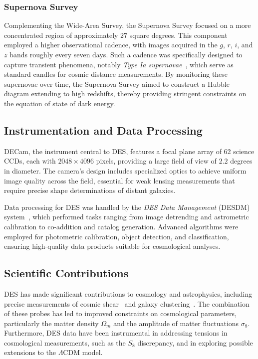 \subsubsection{Supernova Survey}

Complementing the Wide-Area Survey, the Supernova Survey focused on a more concentrated region of approximately $27$ square degrees. This component employed a higher observational cadence, with images acquired in the $g$, $r$, $i$, and $z$ bands roughly every seven days. Such a cadence was specifically designed to capture transient phenomena, notably \emph{Type Ia supernovae}~\cite{2019PhRvL.122q1301A}, which serve as standard candles for cosmic distance measurements. By monitoring these supernovae over time, the Supernova Survey aimed to construct a Hubble diagram extending to high redshifts, thereby providing stringent constraints on the equation of state of dark energy.

\subsection{Instrumentation and Data Processing}

DECam, the instrument central to DES, features a focal plane array of 62 science CCDs, each with $2048 \times 4096$ pixels, providing a large field of view of $2.2$ degrees in diameter. The camera's design includes specialized optics to achieve uniform image quality across the field, essential for weak lensing measurements that require precise shape determinations of distant galaxies.

Data processing for DES was handled by the \emph{DES Data Management} (DESDM) system~\cite{2008SPIE.7016E..0LM}, which performed tasks ranging from image detrending and astrometric calibration to co-addition and catalog generation. Advanced algorithms were employed for photometric calibration, object detection, and classification, ensuring high-quality data products suitable for cosmological analyses.

\subsection{Scientific Contributions}

DES has made significant contributions to cosmology and astrophysics, including precise measurements of cosmic shear~\cite{2022PhRvD.105b3514A} and galaxy clustering~\cite{2022PhRvD.105b3520A}. The combination of these probes has led to improved constraints on cosmological parameters, particularly the matter density $\Omega_m$ and the amplitude of matter fluctuations $\sigma_8$. Furthermore, DES data have been instrumental in addressing tensions in cosmological measurements, such as the $S_8$ discrepancy, and in exploring possible extensions to the $\Lambda$CDM model.


